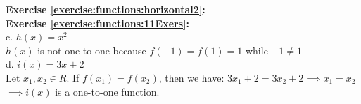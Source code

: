 \noindent\textbf{Exercise \ref{exercise:functions:horizontal2}:}\\



\noindent\textbf{Exercise \ref{exercise:functions:11Exers}:}\\
c. $h(x)=x^2$\\
$h(x)$ is not one-to-one because $f(-1)=f(1)=1$ while $-1\neq 1$\\
d. $i(x)=3x+2$\\
Let $x_1,x_2 \in R$. If $f(x_1)=f(x_2)$, then we have:
$3x_1+2=3x_2+2 \implies x_1=x_2$\\
$\implies i(x)$ is a one-to-one function.\\


